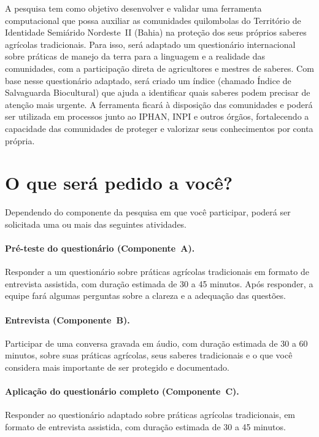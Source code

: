 \documentclass[12pt,a4paper,brazil]{article}
\begin{document}
A pesquisa tem como objetivo desenvolver e validar uma ferramenta computacional que possa auxiliar as comunidades quilombolas do Território de Identidade Semiárido Nordeste~II (Bahia) na proteção dos seus próprios saberes agrícolas tradicionais. Para isso, será adaptado um questionário internacional sobre práticas de manejo da terra para a linguagem e a realidade das comunidades, com a participação direta de agricultores e mestres de saberes. Com base nesse questionário adaptado, será criado um índice (chamado Índice de Salvaguarda Biocultural) que ajuda a identificar quais saberes podem precisar de atenção mais urgente. A ferramenta ficará à disposição das comunidades e poderá ser utilizada em processos junto ao IPHAN, INPI e outros órgãos, fortalecendo a capacidade das comunidades de proteger e valorizar seus conhecimentos por conta própria.

\section*{O que será pedido a você?}

Dependendo do componente da pesquisa em que você participar, poderá ser solicitada uma ou mais das seguintes atividades.

\paragraph{Pré-teste do questionário (Componente~A).} Responder a um questionário sobre práticas agrícolas tradicionais em formato de entrevista assistida, com duração estimada de 30 a 45 minutos. Após responder, a equipe fará algumas perguntas sobre a clareza e a adequação das questões.

\paragraph{Entrevista (Componente~B).} Participar de uma conversa gravada em áudio, com duração estimada de 30 a 60 minutos, sobre suas práticas agrícolas, seus saberes tradicionais e o que você considera mais importante de ser protegido e documentado.

\paragraph{Aplicação do questionário completo (Componente~C).} Responder ao questionário adaptado sobre práticas agrícolas tradicionais, em formato de entrevista assistida, com duração estimada de 30 a 45 minutos.
\end{document}

